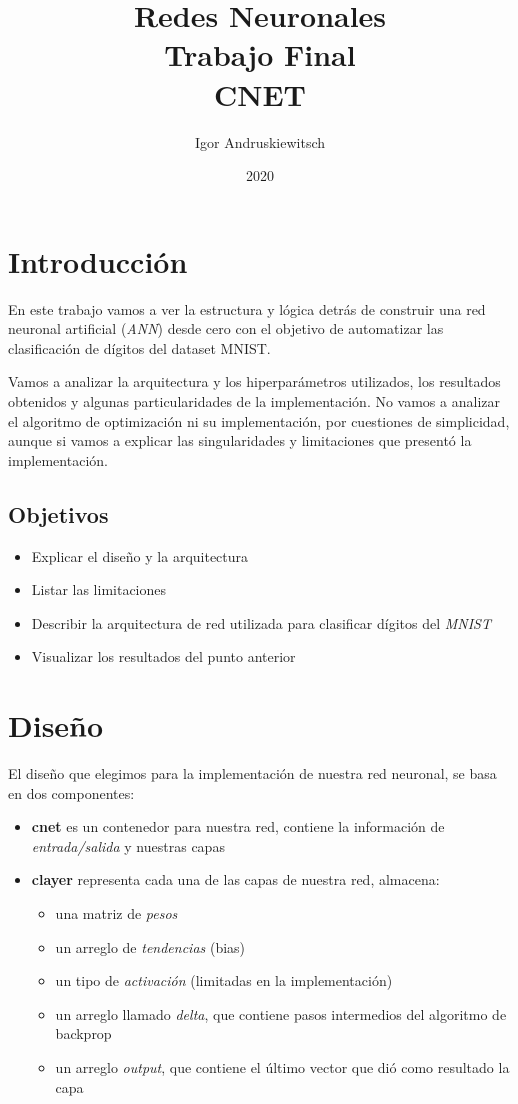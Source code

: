 \documentclass [a4paper,12pt,oneside,final]{article}
\title{%
Redes Neuronales \\
Trabajo Final \\
CNET \\
}
\date{2020}
\author{Igor Andruskiewitsch}
\begin{document}
    \maketitle

\section{Introducción}

En este trabajo vamos a ver la estructura y lógica detrás de construir una red neuronal artificial ({\it ANN}) desde cero con el objetivo de automatizar las clasificación de dígitos del dataset MNIST.

Vamos a analizar la arquitectura y los hiperparámetros utilizados, los resultados obtenidos y algunas particularidades de la implementación. No vamos a analizar el algoritmo de optimización ni su implementación, por cuestiones de simplicidad, aunque si vamos a explicar las singularidades y limitaciones que presentó la implementación.

\subsection{Objetivos}

\begin{itemize}
    \item{Explicar el diseño y la arquitectura}
    \item{Listar las limitaciones}
    \item{Describir la arquitectura de red utilizada para clasificar dígitos del {\it MNIST}}
    \item{Visualizar los resultados del punto anterior}
\end{itemize}

\section{Diseño}

El diseño que elegimos para la implementación de nuestra red neuronal, se basa en dos componentes:

\begin{itemize}
    \item{{\bf cnet} es un contenedor para nuestra red, contiene la información de {\it entrada/salida} y nuestras capas}
    \item{{\bf clayer} representa cada una de las capas de nuestra red, almacena:}
        \begin{itemize}
            \item{una matriz de {\it pesos}}
            \item{un arreglo de {\it tendencias} (bias)}
            \item{un tipo de {\it activación} (limitadas en la implementación)}
            \item{un arreglo llamado {\it delta}, que contiene pasos intermedios del algoritmo de backprop}
            \item{un arreglo {\it output}, que contiene el último vector que dió como resultado la capa}
        \end{itemize}
\end{itemize}
\end{document}
